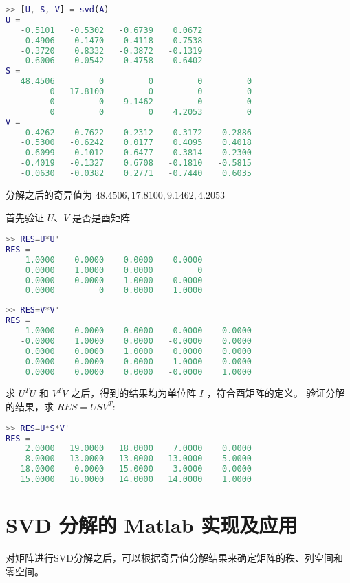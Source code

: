 \begin{lstlisting}[language=Matlab]  
>> [U, S, V] = svd(A)
U =
   -0.5101   -0.5302   -0.6739    0.0672
   -0.4906   -0.1470    0.4118   -0.7538
   -0.3720    0.8332   -0.3872   -0.1319
   -0.6006    0.0542    0.4758    0.6402
S =
   48.4506         0         0         0         0
         0   17.8100         0         0         0
         0         0    9.1462         0         0
         0         0         0    4.2053         0
V =
   -0.4262    0.7622    0.2312    0.3172    0.2886
   -0.5300   -0.6242    0.0177    0.4095    0.4018
   -0.6099    0.1012   -0.6477   -0.3814   -0.2300
   -0.4019   -0.1327    0.6708   -0.1810   -0.5815
   -0.0630   -0.0382    0.2771   -0.7440    0.6035
\end{lstlisting}

分解之后的奇异值为 $48.4506,17.8100,9.1462,4.2053$

首先验证 $U$、$V$ 是否是酉矩阵

\begin{lstlisting}[language=Matlab]  
>> RES=U*U'
RES =
    1.0000    0.0000    0.0000    0.0000
    0.0000    1.0000    0.0000         0
    0.0000    0.0000    1.0000    0.0000
    0.0000         0    0.0000    1.0000
\end{lstlisting}

\begin{lstlisting}[language=Matlab]  
>> RES=V*V'
RES =
    1.0000   -0.0000    0.0000    0.0000    0.0000
   -0.0000    1.0000    0.0000   -0.0000    0.0000
    0.0000    0.0000    1.0000    0.0000    0.0000
    0.0000   -0.0000    0.0000    1.0000   -0.0000
    0.0000    0.0000    0.0000   -0.0000    1.0000
\end{lstlisting}

求 $U^TU$ 和 $V^TV$ 之后，得到的结果均为单位阵 $I$ ，符合酉矩阵的定义。
验证分解的结果，求 $RES=USV^T$:
\begin{lstlisting}[language=Matlab]  
>> RES=U*S*V'
RES =
    2.0000   19.0000   18.0000    7.0000    0.0000
    8.0000   13.0000   13.0000   13.0000    5.0000
   18.0000    0.0000   15.0000    3.0000    0.0000
   15.0000   16.0000   14.0000   14.0000    1.0000
\end{lstlisting}




\section{SVD 分解的 Matlab 实现及应用}

对矩阵进行SVD分解之后，可以根据奇异值分解结果来确定矩阵的秩、列空间和零空间。



